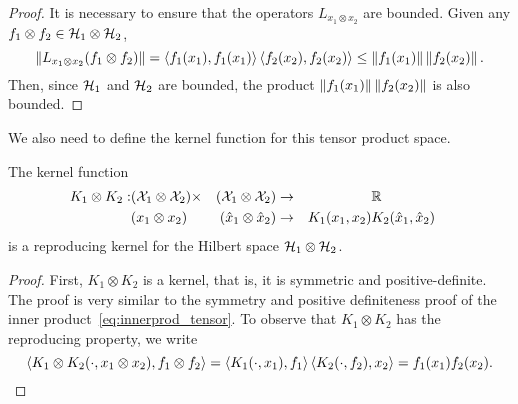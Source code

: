 \begin{proof}
    It is necessary to ensure that the operators $L_{x_1 \otimes x_2}$ are bounded. Given any $f_1 \otimes f_2 \in \mathcal{H}_1 \otimes \mathcal{H}_2$, 
    $$ \left\lVert L_{x_1 \otimes x_2} (f_1 \otimes f_2)\right\rVert = \left\langle f_1(x_1), f_1(x_1) \right\rangle \left\langle f_2(x_2), f_2(x_2) \right\rangle \leq \left\lVert f_1(x_1)\right\rVert  \left\lVert f_2(x_2)\right\rVert .$$
    Then, since $\mathcal{H}_1$ and $\mathcal{H}_2$ are bounded, the product 
$ \left\lVert f_1(x_1)\right\rVert  \left\lVert f_2(x_2)\right\rVert $
is also bounded.
\end{proof}

%
We also need to define the kernel function for this tensor product space.
\begin{proposition}
    The kernel function
    \begin{equation}
        \nonumber
        \begin{aligned}
            K_1 \otimes K_2: &(\mathcal{X}_1 \otimes \mathcal{X}_2) \times &(\mathcal{X}_1 \otimes \mathcal{X}_2) &\to && \mathbb{R} & \\
        &(x_1 \otimes x_2) &(\hat{x}_1 \otimes \hat{x}_2) &\to & K_1(x_1, x_2)  & K_2(\hat{x}_1, \hat{x}_2) &
        \end{aligned}
    \end{equation}
    is a reproducing kernel for the Hilbert space $\mathcal{H}_1 \otimes \mathcal{H}_2$.
\end{proposition} 
\begin{proof}
    First, $K_1 \otimes K_2$ is a kernel, that is, it is symmetric and positive-definite. The proof is very similar to the symmetry and positive definiteness proof of the inner product~\eqref{eq:innerprod_tensor}.
    To observe that $K_1 \otimes K_2$ has the reproducing property, we write
    $$ \left\langle K_1 \otimes K_2 (\cdot, x_1 \otimes x_2), f_1 \otimes f_2 \right\rangle = \left\langle K_1(\cdot, x_1), f_1 \right\rangle \left\langle K_2(\cdot, f_2), x_2 \right\rangle = f_1(x_1) f_2(x_2) .$$
\end{proof}
